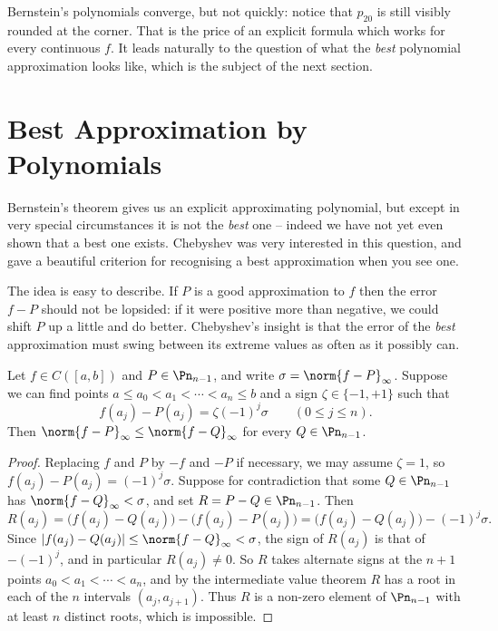 \begin{center}
\end{center}

Bernstein's polynomials converge, but not quickly: notice that $p_{20}$ is still visibly rounded at the corner. That is the price of an explicit formula which works for every continuous $f$. It leads naturally to the question of what the \emph{best} polynomial approximation looks like, which is the subject of the next section.

\section{Best Approximation by Polynomials}

Bernstein's theorem gives us an explicit approximating polynomial, but except in very special circumstances it is not the \emph{best} one -- indeed we have not yet even shown that a best one exists. Chebyshev was very interested in this question, and gave a beautiful criterion for recognising a best approximation when you see one.

The idea is easy to describe. If $P$ is a good approximation to $f$ then the error $f - P$ should not be lopsided: if it were positive more than negative, we could shift $P$ up a little and do better. Chebyshev's insight is that the error of the \emph{best} approximation must swing between its extreme values as often as it possibly can.

\begin{theorem}\label{thm:equiripple}
	Let $f\in C([a,b])$ and $P \in \Pn_{n-1}$, and write $\sigma = \norm{f-P}_\infty$. Suppose we can find points $a \leq a_0 < a_1 < \cdots < a_n\leq b$ and a sign $\zeta\in\{-1,+1\}$ such that
	$$f(a_j)-P(a_j) = \zeta(-1)^j\sigma \qquad (0\leq j\leq n).$$
	Then $\norm{f-P}_\infty \leq \norm{f-Q}_\infty$ for every $Q \in \Pn_{n-1}$.
\end{theorem}

\begin{proof}
	Replacing $f$ and $P$ by $-f$ and $-P$ if necessary, we may assume $\zeta = 1$, so $f(a_j)-P(a_j) = (-1)^j\sigma$. Suppose for contradiction that some $Q\in\Pn_{n-1}$ has $\norm{f-Q}_\infty < \sigma$, and set $R = P - Q\in\Pn_{n-1}$. Then
	$$R(a_j) = \big(f(a_j)-Q(a_j)\big) - \big(f(a_j)-P(a_j)\big) = \big(f(a_j)-Q(a_j)\big) - (-1)^j\sigma.$$
	Since $|f(a_j)-Q(a_j)|\leq \norm{f-Q}_\infty<\sigma$, the sign of $R(a_j)$ is that of $-(-1)^j$, and in particular $R(a_j)\neq 0$. So $R$ takes alternate signs at the $n+1$ points $a_0<a_1<\cdots<a_n$, and by the intermediate value theorem $R$ has a root in each of the $n$ intervals $(a_j,a_{j+1})$. Thus $R$ is a non-zero element of $\Pn_{n-1}$ with at least $n$ distinct roots, which is impossible.
\end{proof}

